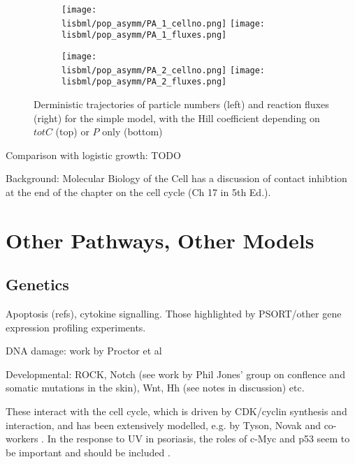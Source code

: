 \documentclass[a4paper,10pt]{report}
\newcommand{\psortbase}{/home/ngrs2/work/bsu/PSORT_Zuliani_Reynolds/}
\newcommand{\sbmlbase}{\psortbase/sbml-sh/}
\newcommand{\lisbml}{\sbmlbase/li_like}
\begin{document}
\begin{figure}[h!]
  \begin{subfigure}{\textwidth}
    \texttt{[image: \\lisbml/pop\_asymm/PA\_1\_cellno.png]}
    \texttt{[image: \\lisbml/pop\_asymm/PA\_1\_fluxes.png]}
  \end{subfigure}
  \begin{subfigure}{\textwidth}
    \texttt{[image: \\lisbml/pop\_asymm/PA\_2\_cellno.png]}
    \texttt{[image: \\lisbml/pop\_asymm/PA\_2\_fluxes.png]}
  \end{subfigure}
  \caption{Derministic trajectories of particle numbers (left) and reaction fluxes (right) for the simple model, with the Hill coefficient depending on $totC$ (top) or $P$ only (bottom)}
  \label{fig:joneslike_hill_osc_PortotC}
\end{figure}
 


Comparison with logistic growth: TODO

Background: Molecular Biology of the Cell \cite{alberts2008molecular} has a discussion of contact inhibtion at the end of the chapter on the cell cycle (Ch 17 in 5th Ed.). 



\chapter{Other Pathways, Other Models}

\section{Genetics}

Apoptosis (refs), cytokine signalling. Those highlighted by PSORT/other gene expression profiling experiments. 

DNA damage: work by Proctor et al \cite{passos2010feedback}


Developmental: ROCK, Notch (see work by Phil Jones' group on conflence and somatic mutations in the skin), Wnt, Hh (see notes in discussion) etc. 

These interact with the cell cycle, which is driven by CDK/cyclin synthesis and interaction, and has been extensively modelled, e.g. by Tyson, Novak and co-workers \cite{tyson1991modeling}. In the response to UV in psoriasis, the roles of c-Myc and p53 seem to be important and should be included \cite{freije2014inactivation,gandarillas2000normal}.
\end{document}
